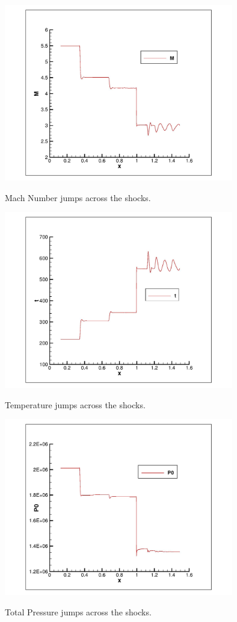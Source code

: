 \documentclass{article}
\begin{document}
\begin{figure}[H]   \label{figure}
\includegraphics[width=10cm]{5.5/Mach_2.jpg}		%
\label{figure:}
\caption{Mach Number jumps across the shocks.}
\end{figure}

\begin{figure}[H]   \label{figure}
\includegraphics[width=10cm]{5.5/Temp_2.jpg}		%
\label{figure:}
\caption{Temperature jumps across the shocks.}
\end{figure}

\begin{figure}[H]   \label{figure}
\includegraphics[width=10cm]{5.5/P_total_2.jpg}		%
\label{figure:}
\caption{Total Pressure jumps across the shocks.}
\end{figure}
\end{document}
